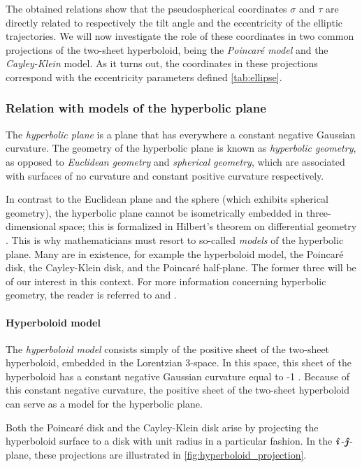 The obtained relations show that the pseudospherical coordinates \(\sigma\) and \(\tau\) are directly related to respectively the tilt angle and the eccentricity of the elliptic trajectories. We will now investigate the role of these coordinates in two common projections of the two-sheet hyperboloid, being the \emph{Poincaré model} and the \emph{Cayley-Klein} model. As it turns out, the coordinates in these projections correspond with the eccentricity parameters defined \cref{tab:ellipse}.

\subsubsection{Relation with models of the hyperbolic plane}
The \emph{hyperbolic plane} is a plane that has everywhere a constant negative Gaussian curvature. The geometry of the hyperbolic plane is known as \emph{hyperbolic geometry}, as opposed to \emph{Euclidean geometry} and \emph{spherical geometry}, which are associated with surfaces of no curvature and constant positive curvature respectively. 

In contrast to the Euclidean plane and the sphere (which exhibits spherical geometry), the hyperbolic plane cannot be isometrically embedded in three-dimensional space; this is formalized in Hilbert's theorem on differential geometry \cite{Thurston1997}. This is why mathematicians must resort to so-called \emph{models} of the hyperbolic plane. Many are in existence, for example the hyperboloid model, the Poincaré disk, the Cayley-Klein disk, and the Poincaré half-plane. The former three will be of our interest in this context. For more information concerning hyperbolic geometry, the reader is referred to \citet{Needham1997,Needham2021} and \citet{Thurston1997}.

\paragraph{Hyperboloid model} The \emph{hyperboloid model} consists simply of the positive sheet of the two-sheet hyperboloid, embedded in the Lorentzian 3-space. In this space, this sheet of the hyperboloid has a constant negative Gaussian curvature equal to -1 \cite{Balazs1986}. Because of this constant negative curvature, the positive sheet of the two-sheet hyperboloid can serve as a model for the hyperbolic plane.

Both the Poincaré disk and the Cayley-Klein disk arise by projecting the hyperboloid surface to a disk with unit radius in a particular fashion. In the \(\quati\)-\(\quatj\)-plane, these projections are illustrated in \cref{fig:hyperboloid_projection}.

